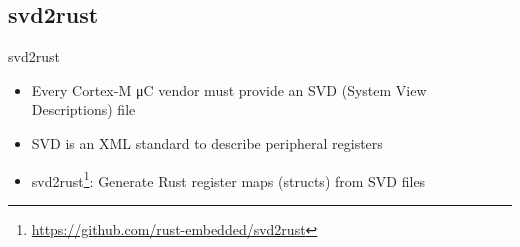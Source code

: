 \documentclass[aspectratio=1610,14pt,t]{beamer}
\begin{document}
\subsection{svd2rust}

\begin{frame}[c]{svd2rust}
  \begin{itemize}
    \item Every Cortex-M μC vendor must provide an SVD (System View
      Descriptions) file
    \item SVD is an XML standard to describe peripheral registers
    \item svd2rust\footnote{\url{https://github.com/rust-embedded/svd2rust}}:
      Generate Rust register maps (structs) from SVD files
  \end{itemize}
\end{frame}
\end{document}
